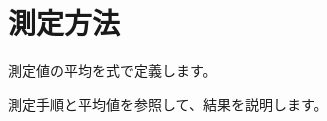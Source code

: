 \documentclass[dvipdfmx]{jlreq}
\begin{document}

\section{測定方法}

測定値の平均を式で定義します。

測定手順と平均値を参照して、結果を説明します。
\end{document}
